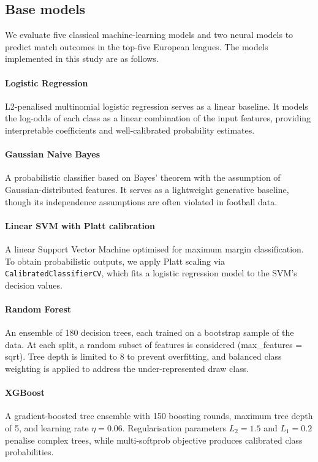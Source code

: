 \documentclass[pdflatex,sn-mathphys-num]{sn-jnl}
\theoremstyle{thmstyleone}
\theoremstyle{thmstyletwo}
\theoremstyle{thmstylethree}
\begin{document}
\subsection{Base models}\label{subsec:learners}

We evaluate five classical machine-learning models and two neural models to predict match outcomes in the top-five European leagues. The models implemented in this study are as follows.

\paragraph{Logistic Regression}
L2-penalised multinomial logistic regression serves as a linear baseline. It models the log-odds of each class as a linear combination of the input features, providing interpretable coefficients and well-calibrated probability estimates.

\paragraph{Gaussian Naive Bayes}
A probabilistic classifier based on Bayes' theorem with the assumption of Gaussian-distributed features. It serves as a lightweight generative baseline, though its independence assumptions are often violated in football data.

\paragraph{Linear SVM with Platt calibration}
A linear Support Vector Machine optimised for maximum margin classification. To obtain probabilistic outputs, we apply Platt scaling via \texttt{CalibratedClassifierCV}, which fits a logistic regression model to the SVM's decision values.

\paragraph{Random Forest}
An ensemble of 180 decision trees, each trained on a bootstrap sample of the data. At each split, a random subset of features is considered (max\_features = sqrt). Tree depth is limited to 8 to prevent overfitting, and balanced class weighting is applied to address the under-represented draw class.

\paragraph{XGBoost}
A gradient-boosted tree ensemble with 150 boosting rounds, maximum tree depth of 5, and learning rate $\eta = 0.06$. Regularisation parameters $L_2 = 1.5$ and $L_1 = 0.2$ penalise complex trees, while multi-softprob objective produces calibrated class probabilities.
\end{document}
